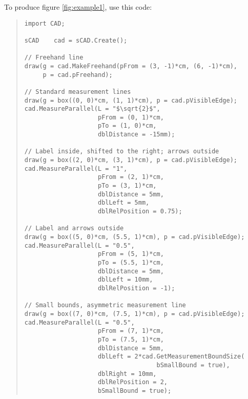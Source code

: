 \documentclass{ltxguide}
\begin{document}
To produce figure \ref{fig:example1}, use this code:
\begin{quote}
\begin{verbatim}
import CAD;

sCAD    cad = sCAD.Create();

// Freehand line
draw(g = cad.MakeFreehand(pFrom = (3, -1)*cm, (6, -1)*cm),
     p = cad.pFreehand);

// Standard measurement lines
draw(g = box((0, 0)*cm, (1, 1)*cm), p = cad.pVisibleEdge);
cad.MeasureParallel(L = "$\sqrt{2}$",
                    pFrom = (0, 1)*cm,
                    pTo = (1, 0)*cm,
                    dblDistance = -15mm);

// Label inside, shifted to the right; arrows outside
draw(g = box((2, 0)*cm, (3, 1)*cm), p = cad.pVisibleEdge);
cad.MeasureParallel(L = "1",
                    pFrom = (2, 1)*cm,
                    pTo = (3, 1)*cm,
                    dblDistance = 5mm,
                    dblLeft = 5mm,
                    dblRelPosition = 0.75);

// Label and arrows outside
draw(g = box((5, 0)*cm, (5.5, 1)*cm), p = cad.pVisibleEdge);
cad.MeasureParallel(L = "0.5",
                    pFrom = (5, 1)*cm,
                    pTo = (5.5, 1)*cm,
                    dblDistance = 5mm,
                    dblLeft = 10mm,
                    dblRelPosition = -1);

// Small bounds, asymmetric measurement line
draw(g = box((7, 0)*cm, (7.5, 1)*cm), p = cad.pVisibleEdge);
cad.MeasureParallel(L = "0.5",
                    pFrom = (7, 1)*cm,
                    pTo = (7.5, 1)*cm,
                    dblDistance = 5mm,
                    dblLeft = 2*cad.GetMeasurementBoundSize(
                                    bSmallBound = true),
                    dblRight = 10mm,
                    dblRelPosition = 2,
                    bSmallBound = true);
\end{verbatim}
\end{quote}
\end{document}
